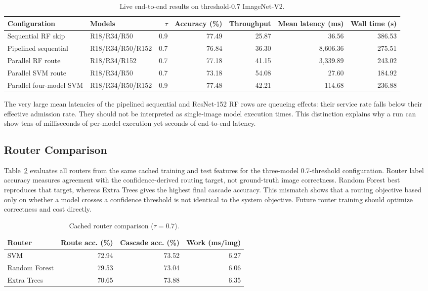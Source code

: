 \begin{table}[t]
\caption{Live end-to-end results on threshold-0.7 ImageNet-V2.}
\label{tab:live}
\centering
\small
\begin{tabular}{llrrrrr}
\hline
Configuration & Models & $\tau$ & Accuracy (\%) & Throughput & Mean latency (ms) & Wall time (s) \\
\hline
Sequential RF skip & R18/R34/R50 & 0.9 & 77.49 & 25.87 & 36.56 & 386.53 \\
Pipelined sequential & R18/R34/R50/R152 & 0.7 & 76.84 & 36.30 & 8,606.36 & 275.51 \\
Parallel RF route & R18/R34/R152 & 0.7 & 77.18 & 41.15 & 3,339.89 & 243.02 \\
Parallel SVM route & R18/R34/R50 & 0.7 & 73.18 & 54.08 & 27.60 & 184.92 \\
Parallel four-model SVM & R18/R34/R50/R152 & 0.9 & 77.48 & 42.21 & 114.68 & 236.88 \\
\hline
\end{tabular}
\end{table}

The very large mean latencies of the pipelined sequential and ResNet-152 RF
rows are queueing effects: their service rate falls below their effective
admission rate.  They should not be interpreted as single-image model
execution times.  This distinction explains why a run can show tens of
milliseconds of per-model execution yet seconds of end-to-end latency.

\subsection{Router Comparison}

Table~\ref{tab:router} evaluates all routers from the same cached training and
test features for the three-model 0.7-threshold configuration.  Router label
accuracy measures agreement with the confidence-derived routing target, not
ground-truth image correctness.  Random Forest best reproduces that target,
whereas Extra Trees gives the highest final cascade accuracy.  This mismatch
shows that a routing objective based only on whether a model crosses a
confidence threshold is not identical to the system objective.  Future router
training should optimize correctness and cost directly.

\begin{table}[t]
\caption{Cached router comparison ($\tau=0.7$).}
\label{tab:router}
\centering
\small
\begin{tabular}{lrrr}
\hline
Router & Route acc. (\%) & Cascade acc. (\%) & Work (ms/img) \\
\hline
SVM & 72.94 & 73.52 & 6.27 \\
Random Forest & 79.53 & 73.04 & 6.06 \\
Extra Trees & 70.65 & 73.88 & 6.35 \\
\hline
\end{tabular}
\end{table}


